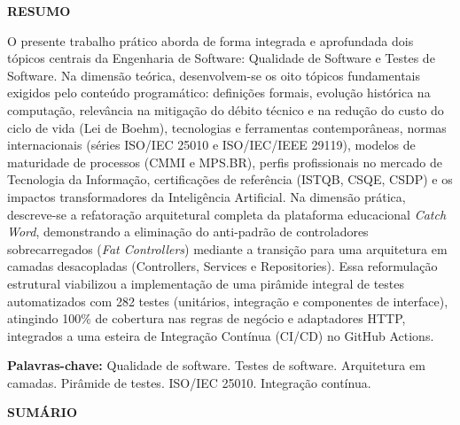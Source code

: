 \documentclass[12pt,a4paper]{article}
\begin{document}
\thispagestyle{empty}
\begin{center}
    \textbf{\MakeUppercase{Resumo}}
\end{center}
\vspace{0.2cm}

\noindent\footnotesize O presente trabalho prático aborda de forma integrada e aprofundada dois tópicos centrais da Engenharia de Software: Qualidade de Software e Testes de Software. Na dimensão teórica, desenvolvem-se os oito tópicos fundamentais exigidos pelo conteúdo programático: definições formais, evolução histórica na computação, relevância na mitigação do débito técnico e na redução do custo do ciclo de vida (Lei de Boehm), tecnologias e ferramentas contemporâneas, normas internacionais (séries ISO/IEC 25010 e ISO/IEC/IEEE 29119), modelos de maturidade de processos (CMMI e MPS.BR), perfis profissionais no mercado de Tecnologia da Informação, certificações de referência (ISTQB, CSQE, CSDP) e os impactos transformadores da Inteligência Artificial. Na dimensão prática, descreve-se a refatoração arquitetural completa da plataforma educacional \textit{Catch Word}, demonstrando a eliminação do anti-padrão de controladores sobrecarregados (\textit{Fat Controllers}) mediante a transição para uma arquitetura em camadas desacopladas (Controllers, Services e Repositories). Essa reformulação estrutural viabilizou a implementação de uma pirâmide integral de testes automatizados com 282 testes (unitários, integração e componentes de interface), atingindo 100\% de cobertura nas regras de negócio e adaptadores HTTP, integrados a uma esteira de Integração Contínua (CI/CD) no GitHub Actions.

\vspace{0.3cm}
\noindent\footnotesize \textbf{Palavras-chave:} Qualidade de software. Testes de software. Arquitetura em camadas. Pirâmide de testes. ISO/IEC 25010. Integração contínua.

\vspace{0.8cm}
\begin{center}
    \textbf{\MakeUppercase{Sumário}}
\end{center}
\vspace{0.2cm}
\end{document}

